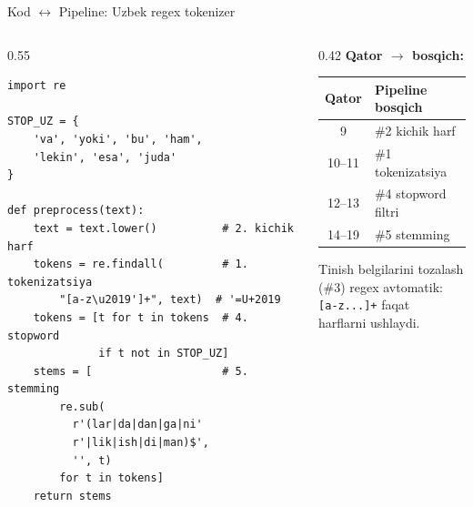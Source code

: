 \documentclass[aspectratio=169,11pt]{beamer}
\begin{document}
\begin{frame}[fragile]{Kod $\leftrightarrow$ Pipeline: Uzbek regex tokenizer}
  \begin{columns}[T]
    \begin{column}{0.55\textwidth}
\begin{lstlisting}[title=preprocessing\_uz.py]
import re

STOP_UZ = {
    'va', 'yoki', 'bu', 'ham',
    'lekin', 'esa', 'juda'
}

def preprocess(text):
    text = text.lower()          # 2. kichik harf
    tokens = re.findall(         # 1. tokenizatsiya
        "[a-z\u2019']+", text)  # '=U+2019
    tokens = [t for t in tokens  # 4. stopword
              if t not in STOP_UZ]
    stems = [                    # 5. stemming
        re.sub(
          r'(lar|da|dan|ga|ni'
          r'|lik|ish|di|man)$',
          '', t)
        for t in tokens]
    return stems
\end{lstlisting}
    \end{column}
    \begin{column}{0.42\textwidth}
      \textbf{Qator $\to$ bosqich:}\\[4pt]
      \small
      \begin{tabular}{cl}
        \toprule
        Qator & Pipeline bosqich \\
        \midrule
        9  & \#2 kichik harf \\
        10--11 & \#1 tokenizatsiya \\
        12--13 & \#4 stopword filtri \\
        14--19 & \#5 stemming \\
        \bottomrule
      \end{tabular}
      \vspace{5pt}
      \begin{tcolorbox}[warnbox,title=Eslatma,top=2pt,bottom=2pt]
        \footnotesize
        Tinish belgilarini tozalash\\
        (\#3) regex avtomatik:\\
        \texttt{[a-z...]+} faqat\\
        harflarni ushlaydi.
      \end{tcolorbox}
    \end{column}
  \end{columns}
\end{frame}
\end{document}
